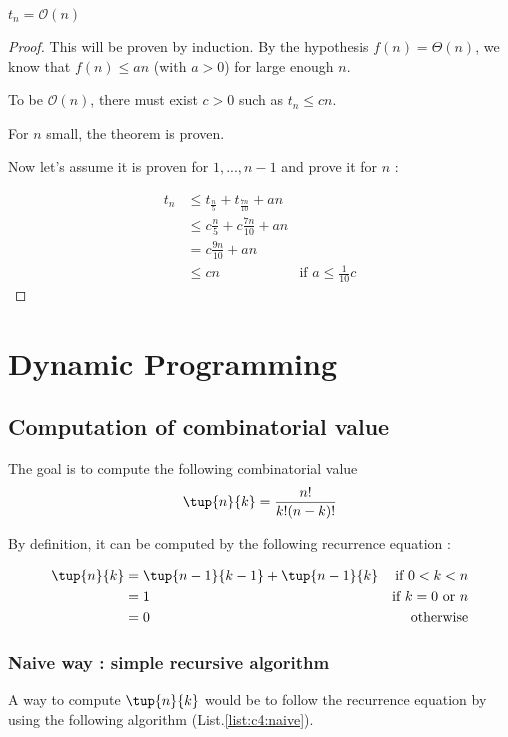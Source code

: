 \begin{theorem}
$t_n = \mathcal{O} (n)$
\end{theorem}

\begin{proof}This will be proven by induction. By the hypothesis $f(n) = \Theta (n)$, we know that $f(n) \leq an$ (with $a>0$) for large enough $n$.

To be $\mathcal{O}(n)$, there must exist $c>0$ such as $t_n \leq cn$.

For $n$ small, the theorem is proven.

Now let's assume it is proven for $1,...,n-1$ and prove it for $n$ :

\begin{align*}
t_n &\leq t_{\frac{n}{5}} + t_{\frac{7n}{10}} + an\\
&\leq c \frac{n}{5} + c \frac{7n}{10} + an \\
&= c \frac{9n}{10} + an\\
&\leq cn &\text{if } a\leq \frac{1}{10}c
\end{align*}
\end{proof}


\chapter{Dynamic Programming}

\section{Computation of combinatorial value}



The goal is to compute the following combinatorial value  $$\tup{n}{k} = \frac{n!}{k!(n-k)!}$$

By definition, it can be computed by the following recurrence equation :

\begin{align*}
\tup{n}{k} &= \tup{n-1}{k-1} + \tup{n-1}{k} & \text{if } 0 < k<n\\
&=1 & \text{if } k=0\text{ or }n\\
&=0 & \text{otherwise}
\end{align*}

\subsection{Naive way : simple recursive algorithm}

A way to compute $\tup{n}{k}$ would be to follow the recurrence equation by using the following algorithm (List.\ref{list:c4:naive}).

